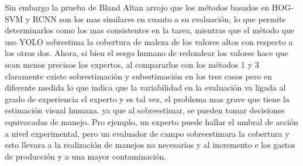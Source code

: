 \documentclass[journal,article,submit,moreauthors,pdftex]{Definitions/mdpi}
\begin{document}
Sin embargo la prueba de Bland Altan arrojo que los métodos basados en HOG-SVM y RCNN son los mas similares en cuanto a su evaluación, lo que permite determinarlos como los mas consistentes en la tarea, mientras que el método que uso YOLO sobrestima la cobertura de maleza de los valores altos con respecto a los otros dos. Ahora, si bien el sesgo humano de redondear los valores hace que sean menos precisos los expertos, al compararlos con los métodos 1 y 3 claramente existe sobrestimación y subestimación en los tres casos pero en diferente medida lo que indica que la variabilidad en la evaluación va ligada al grado de experiencia el experto y es tal vez, el problema mas grave que tiene la estimación visual humana. ya que al sobreestimar, se pueden tomar decisiones equivocadas de manejo. Pro ejemplo, un experto puede hallar el umbral de acción a nivel experimental, pero un evaluador de campo sobreestimara la cobertura y esto llevara a la realización de manejos no necesarios y al incremento e los gastos de producción y a una mayor contaminación.



\end{document}
